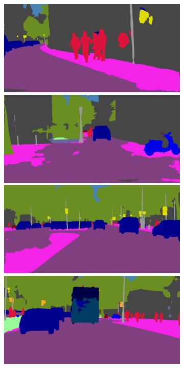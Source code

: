 {\begin{figure}[t]
{{\begin{subfigure}[t]{0.24\linewidth}
\begin{center}
		\includegraphics[width=\linewidth,trim={0px 60px 0 0px},clip]{failure/bielefeld_000000_025748_semantic_segmentation_rgb.png}
		\includegraphics[width=\linewidth,trim={0px 60px 0 0px},clip]{failure/mainz_000001_044366_semantic_segmentation_rgb.png}
		\includegraphics[width=\linewidth,trim={0px 60px 0 0px},clip]{failure/berlin_000001_000019_semantic_segmentation_rgb.png}
		\includegraphics[width=\linewidth,trim={0px 60px 0 0px},clip]{failure/berlin_000040_000019_semantic_segmentation_rgb.png}

\end{center}
\end{subfigure}}}
\end{figure}}

